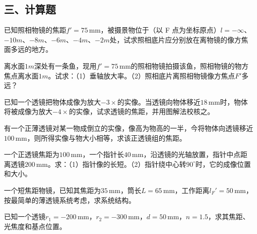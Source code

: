 \documentclass[standard, analysis, notocnum]{ExBook}
\newcommand{\answerarea}[1][8cm]{%
  \par\vspace{2mm}%
  \noindent{\color{themeColor!35}\rule{\linewidth}{0.4pt}}\par
  \noindent\begin{minipage}[t][#1][t]{\linewidth}\vspace{0pt}\end{minipage}\par
  \noindent{\color{themeColor!35}\rule{\linewidth}{0.4pt}}\par
}
\begin{document}
\subsection{三、计算题}
\begin{qitems}[startnum=1]
\qitem 已知照相物镜的焦距$f'=75\,\mathrm{mm}$，被摄景物位于（以 F 点为坐标原点）$l=-\infty$、$-10m$、$-8m$、$-6m$、$-4m$、$-2m$处，试求照相底片应分别放在离物镜的像方焦面多远的地方。
\label{q:37:start}
\answerarea[8cm]
\label{q:37:end}
\end{qitems}

\begin{qitems}[startnum=2]
\qitem 离水面$1m$深处有一条鱼，现用$f'=75\,\mathrm{mm}$的照相物镜拍摄该鱼，照相物镜的物方焦点离水面$1m$。试求：（1）垂轴放大率。（2）照相底片离照相物镜像方焦点$F'$多远？
\label{q:38:start}
\answerarea[8cm]
\label{q:38:end}
\end{qitems}

\begin{qitems}[startnum=3]
\qitem 已知一个透镜把物体成像为放大$-3\times$的实像。当透镜向物体移近$18\,\mathrm{mm}$时，物体将被成像为放大$-4\times$的实像，试求透镜的焦距，并用图解法校核之。
\label{q:39:start}
\answerarea[8cm]
\label{q:39:end}
\end{qitems}

\begin{qitems}[startnum=4]
\qitem 有一个正薄透镜对某一物成倒立的实像，像高为物高的一半，今将物体向透镜移近$100\,\mathrm{mm}$，则所得实像与物大小相等，求该正透镜组的焦距。
\label{q:40:start}
\answerarea[8cm]
\label{q:40:end}
\end{qitems}

\begin{qitems}[startnum=5]
\qitem 一个正透镜焦距为$100\,\mathrm{mm}$，一个指针长$40\,\mathrm{mm}$，沿透镜的光轴放置，指针中点距离透镜$200\,\mathrm{mm}$。求：（1）指针像的长短。（2）指针绕中心转$90^{\circ}$时，它的成像位置和大小。
\label{q:41:start}
\answerarea[8cm]
\label{q:41:end}
\end{qitems}

\begin{qitems}[startnum=6]
\qitem 一个短焦距物镜，已知其焦距为$35\,\mathrm{mm}$，筒长$L=65\,\mathrm{mm}$，工作距离$l_{F}'=50\,\mathrm{mm}$，按最简单的薄透镜系统考虑，求系统结构。
\label{q:42:start}
\answerarea[8cm]
\label{q:42:end}
\end{qitems}

\begin{qitems}[startnum=7]
\qitem 已知一个透镜$r_{1}=-200\,\mathrm{mm}$，$r_{2}=-300\,\mathrm{mm}$，$d=50\,\mathrm{mm}$，$n=1.5$，求其焦距、光焦度和基点位置。
\label{q:43:start}
\answerarea[8cm]
\label{q:43:end}
\end{qitems}
\end{document}
